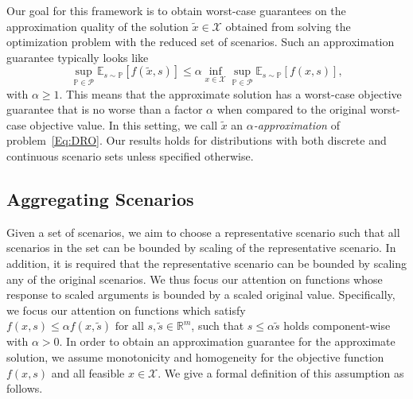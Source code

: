 \documentclass{article}
\newcommand{\mX}{\mathcal{X}}
\newcommand{\mP}{\mathcal{P}}
\newcommand{\mS}{\mathcal{S}}
\newcommand{\R}{\mathbb{R}}
\newcommand{\E}{\mathbb{E}}
\newcommand{\newscen}[1]{\tilde{s}_{#1}}%
\newcommand{\prob}{\mathbb{P}}
\begin{document}
Our goal for this framework is to obtain worst-case guarantees on the approximation quality of the solution \(\tilde{x}\in\mX\) obtained from solving the optimization problem with the reduced set of scenarios. 
Such an approximation guarantee typically looks like
\begin{equation}
\sup_{\prob\in\mP} \E_{s\sim \prob} \left[f(\tilde{x},s)\right] \leq \alpha \inf_{x\in\mX}  \sup_{\prob\in\mP} \E_{s\sim \prob} \left[f(x,s)\right],\label{Eq:Approx_quality}
\end{equation}
with \(\alpha \geq 1\).
This means that the approximate solution has a worst-case objective guarantee that is no worse than a factor \(\alpha\) when compared to the original worst-case objective value.
In this setting, we call \(\tilde{x}\) an \emph{\(\alpha\)-approximation} of problem~\eqref{Eq:DRO}.
Our results holds for distributions with both discrete and continuous scenario sets unless specified otherwise.

\subsection{Aggregating Scenarios}\label{Sec:AggregatingScen}
Given a set of scenarios, we aim to choose a representative scenario such that all scenarios in the set can be bounded by scaling of the representative scenario.
In addition, it is required that the representative scenario can be bounded by scaling any of the original scenarios.
We thus focus our attention on functions whose response to scaled arguments is bounded by a scaled original value.
Specifically, we focus our attention on functions which satisfy $f(x,s) \leq \alpha f(x, \tilde{s}) \text{ for all } s, \tilde{s} \in \R^m$,
such that $s \leq \alpha \tilde{s}$ holds component-wise with $\alpha>0$.
In order to obtain an approximation guarantee for the approximate solution, we assume monotonicity and homogeneity for the objective function \(f(x,s)\) and all feasible $x\in\mX$.
We give a formal definition of this assumption as follows.

\end{document}
